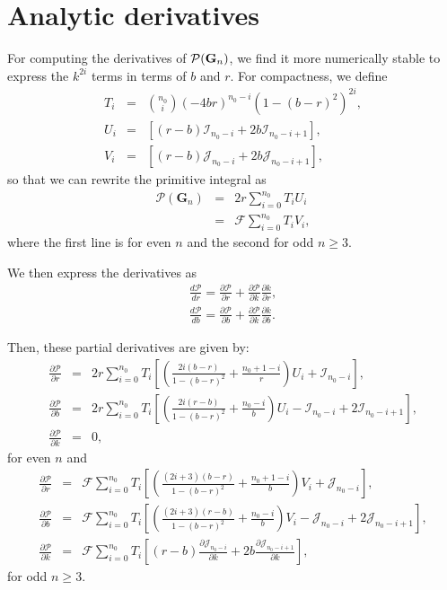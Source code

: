 \documentclass[modern]{aastex61}
\begin{document}
\section{Analytic derivatives}

For computing the derivatives of $\mathcal{P}({\mathbf{G}}_n)$, we find it more numerically 
stable to express the $k^{2i}$ terms in terms of $b$ and $r$.  For compactness, we define
\begin{eqnarray}
T_i &=&  \binom{n_0}{i}(-4br)^{n_0-i}(1-(b-r)^2)^{2i},\\
U_i &=&  \left[(r-b)\mathcal{I}_{n_0-i} + 2b \mathcal{I}_{n_0-i+1}\right],\\
V_i &=&  \left[(r-b)\mathcal{J}_{n_0-i} + 2b \mathcal{J}_{n_0-i+1}\right],
\end{eqnarray}
so that we can rewrite the primitive integral as
\begin{eqnarray}
\mathcal{P}(\mathbf{G}_n) &=& 2r \sum_{i=0}^{n_0} T_i U_i\\
&=& \mathcal{F} \sum_{i=0}^{n_0} T_i V_i,
\end{eqnarray}
where the first line is for even $n$ and the second for odd $n \ge 3$.

We then express the derivatives as
\begin{eqnarray}
\frac{d \mathcal{P}}{d r} = \frac{\partial \mathcal{P}}{\partial r}  +  \frac{\partial \mathcal{P}}{\partial k} \frac{\partial k}{\partial r},\\
\frac{d \mathcal{P}}{d b} = \frac{\partial \mathcal{P}}{\partial b}  +  \frac{\partial \mathcal{P}}{\partial k} \frac{\partial k}{\partial b}.
\end{eqnarray}

Then, these partial derivatives are given by:
\begin{eqnarray}
\frac{\partial \mathcal{P}}{\partial r}  &=& 2r\sum_{i=0}^{n_0} T_i  \left[\left(\frac{2i(b-r)}{1-(b-r)^2} + \frac{n_0+1-i}{r}\right) U_i + \mathcal{I}_{n_0-i}\right],\\
\frac{\partial \mathcal{P}}{\partial b}  &=& 2r\sum_{i=0}^{n_0} T_i  \left[\left(\frac{2i(r-b)}{1-(b-r)^2} + \frac{n_0-i}{b}\right) U_i - \mathcal{I}_{n_0-i} + 2\mathcal{I}_{n_0-i+1}\right],\\
\frac{\partial \mathcal{P}}{\partial k}  &=& 0,
\end{eqnarray}
for even $n$ and
\begin{eqnarray}
\frac{\partial \mathcal{P}}{\partial r}  &=& \mathcal{F}\sum_{i=0}^{n_0} T_i \left[\left(\frac{(2i+3)(b-r)}{1-(b-r)^2} + \frac{n_0+1-i}{b}\right) V_i + \mathcal{J}_{n_0-i}\right],\\
\frac{\partial \mathcal{P}}{\partial b}  &=& \mathcal{F}\sum_{i=0}^{n_0} T_i \left[\left(\frac{(2i+3)(r-b)}{1-(b-r)^2} + \frac{n_0-i}{b}\right) V_i - \mathcal{J}_{n_0-i} + 2\mathcal{J}_{n_0-i+1}\right],\\
\frac{\partial \mathcal{P}}{\partial k}  &=& \mathcal{F}\sum_{i=0}^{n_0} T_i \left[(r-b) \frac{\partial\mathcal{J}_{n_0-i}}{\partial k} + 2b \frac{\partial \mathcal{J}_{n_0-i+1}}{\partial k}\right],
\end{eqnarray}
for odd $n \ge 3$.
\end{document}
